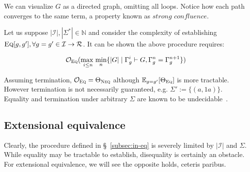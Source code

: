 \documentclass[11pt]{article}
\begin{document}
    \noindent We can visualize $G$ as a directed graph, omitting all loops. Notice how each path converges to the same term, a property known as $\textit{strong confluence}$.

    \hspace{12pt}

    \noindent Let us suppose $|\mathcal{I}|, |\Sigma^*| \in \mathbb{N}$ and consider the complexity of establishing $\textsc{Eq}[g, g'], \forall g = g' \in \mathcal{I} \rightarrow \mathcal{R}$. It can be shown the above procedure requires:

    $$\mathcal{O}_{\textsc{Eq}}(\underset{i \leq n}{\text{max }}\underset{n}{\text{min}}\{|G| \mid \Gamma^i_g \vdash G, \Gamma_g^n = \Gamma_g^{n+1}\})$$ %

    \noindent Assuming termination, $\mathcal{O}_{\textsc{Eq}} = \Theta_{\textsc{Neq}}$ although $\mathbb{E}_{g=g'}[\Theta_\textsc{Eq}]$ is more tractable. However termination is not necessarily guaranteed, e.g. $\Sigma' := \{(a, 1a)\}$. Equality and termination under arbitrary $\Sigma$ are known to be undecidable~\citep{baader1999term}.

    \subsection{Extensional equivalence}\label{subsec:ex-eq}

    Clearly, the procedure defined in \S~\ref{subsec:in-eq} is severely limited by $|\mathcal{I}|$ and $\Sigma$. While equality may be tractable to establish, disequality is certainly an obstacle. For extensional equivalence, we will see the opposite holds, ceteris paribus.
\end{document}
